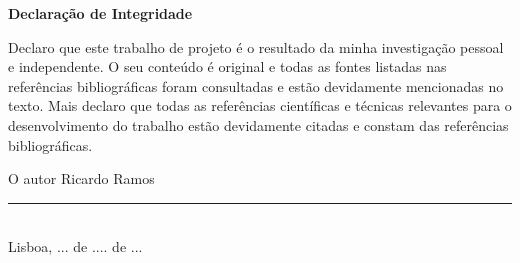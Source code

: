 {\centering\bfseries\fontsize{17}{24}\selectfont Declaração de Integridade \par}
\vspace{1cm}

Declaro que este trabalho de projeto é o resultado da minha investigação pessoal e independente. O seu conteúdo é original e todas as fontes listadas nas referências bibliográficas foram consultadas e estão devidamente mencionadas no texto. Mais declaro que todas as referências científicas e técnicas relevantes para o desenvolvimento do trabalho estão devidamente citadas e constam das referências bibliográficas.

\begin{center}
O autor Ricardo Ramos
\\[2em]

\rule{.5\textwidth}{1pt}
\\[.5em]
\fontsize{10}{12.2}
\selectfont
Lisboa, ...  de .... de ...
\end{center}
